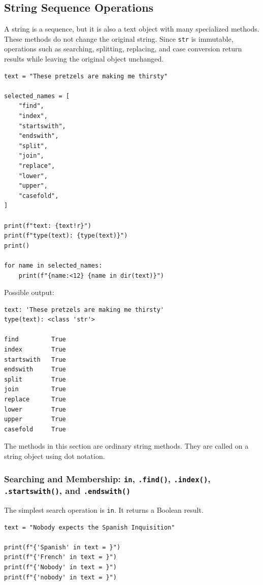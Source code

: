 \subsection{String Sequence Operations}

A string is a sequence, but it is also a text object with many specialized methods. These methods do not change the original string. Since \texttt{str} is immutable, operations such as searching, splitting, replacing, and case conversion return results while leaving the original object unchanged.

\begin{verbatim}
text = "These pretzels are making me thirsty"

selected_names = [
    "find",
    "index",
    "startswith",
    "endswith",
    "split",
    "join",
    "replace",
    "lower",
    "upper",
    "casefold",
]

print(f"text: {text!r}")
print(f"type(text): {type(text)}")
print()

for name in selected_names:
    print(f"{name:<12} {name in dir(text)}")
\end{verbatim}

Possible output:

\begin{verbatim}
text: 'These pretzels are making me thirsty'
type(text): <class 'str'>

find         True
index        True
startswith   True
endswith     True
split        True
join         True
replace      True
lower        True
upper        True
casefold     True
\end{verbatim}

The methods in this section are ordinary string methods. They are called on a string object using dot notation.

\subsubsection{Searching and Membership: \texttt{in}, \texttt{.find()}, \texttt{.index()}, \texttt{.startswith()}, and \texttt{.endswith()}}

The simplest search operation is \texttt{in}. It returns a Boolean result.

\begin{verbatim}
text = "Nobody expects the Spanish Inquisition"

print(f"{'Spanish' in text = }")
print(f"{'French' in text = }")
print(f"{'Nobody' in text = }")
print(f"{'nobody' in text = }")
\end{verbatim}

